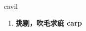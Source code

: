 
\begin{frame}
{\huge cavil}
\begin{center}
\begin{enumerate}\Large
  \item \textbf{挑剔，吹毛求疵 carp}
\end{enumerate}
\end{center}
\end{frame}
